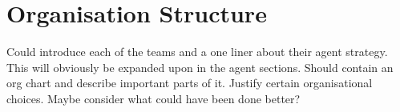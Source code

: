 \chapter{Organisation Structure}\label{organisation_structure}

Could introduce each of the teams and a one liner about their agent strategy. This will obviously be expanded upon in the agent sections.
Should contain an org chart and describe important parts of it.
Justify certain organisational choices.
Maybe consider what could have been done better?
